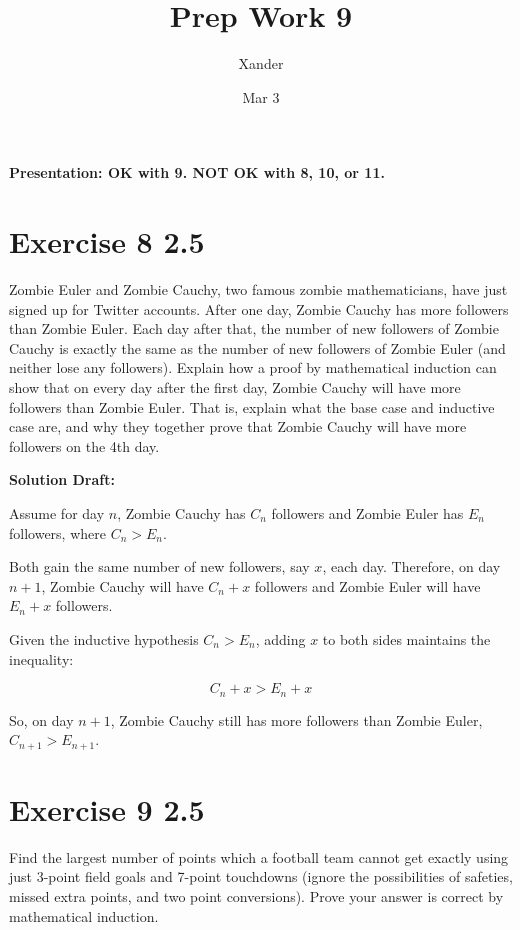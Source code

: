 \documentclass{article}
\title{Prep Work 9}
\author{Xander}
\date{Mar 3}
\begin{document}
\maketitle
\noindent\textbf{Presentation: OK with 9. NOT OK with 8, 10, or 11.} 

\section*{Exercise 8 2.5}  

Zombie Euler and Zombie Cauchy, two famous zombie mathematicians, have just signed up for Twitter accounts. After one day, Zombie Cauchy has more followers than Zombie Euler. Each day after that, the number of new followers of Zombie Cauchy is exactly the same as the number of new followers of Zombie Euler (and neither lose any followers). Explain how a proof by mathematical induction can show that on every day after the first day, Zombie Cauchy will have more followers than Zombie Euler. That is, explain what the base case and inductive case are, and why they together prove that Zombie Cauchy will have more followers on the 4th day.

\vspace{0.5cm}
\noindent\textbf{Solution Draft:} 
\vspace{0.2cm}

Assume for day $n$, Zombie Cauchy has $C_n$ followers and Zombie Euler has $E_n$ followers, where $C_n > E_n$.

Both gain the same number of new followers, say $x$, each day. Therefore, on day $n+1$, Zombie Cauchy will have $C_n + x$ followers and Zombie Euler will have $E_n + x$ followers.

Given the inductive hypothesis $C_n > E_n$, adding $x$ to both sides maintains the inequality:

\[
C_n + x > E_n + x
\]

So, on day $n+1$, Zombie Cauchy still has more followers than Zombie Euler, $C_{n+1} > E_{n+1}$.

\section*{Exercise 9 2.5}  

Find the largest number of points which a football team cannot get exactly using just 3-point field goals and 7-point touchdowns (ignore the possibilities of safeties, missed extra points, and two point conversions). Prove your answer is correct by mathematical induction.
\end{document}
